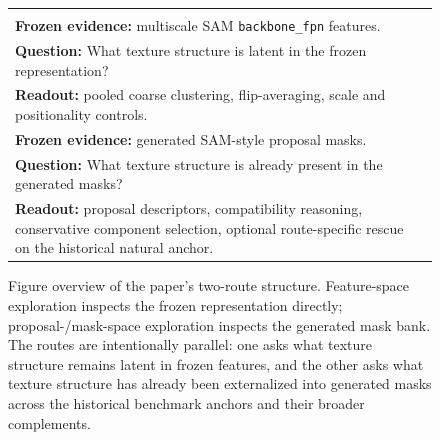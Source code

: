 \begin{figure}[t]
\centering
\setlength{\tabcolsep}{10pt}
\renewcommand{\arraystretch}{1.08}
\begin{tabularx}{\textwidth}{@{}>{\raggedright\arraybackslash}m{}>{\raggedright\arraybackslash}m{}@{}}
\fbox{%
\begin{minipage}[t][4.4cm][t]{0.44\textwidth}
\textbf{Feature-Space Exploration} \\
\textbf{Frozen evidence:} multiscale SAM \texttt{backbone\_fpn} features. \\
\textbf{Question:} What texture structure is latent in the frozen representation? \\
\textbf{Readout:} pooled coarse clustering, flip-averaging, scale and positionality controls.
\end{minipage}}
&
\fbox{%
\begin{minipage}[t][4.4cm][t]{0.44\textwidth}
\textbf{Proposal-/Mask-Space Exploration} \\
\textbf{Frozen evidence:} generated SAM-style proposal masks. \\
\textbf{Question:} What texture structure is already present in the generated masks? \\
\textbf{Readout:} proposal descriptors, compatibility reasoning, conservative component selection, optional route-specific rescue on the historical natural anchor.
\end{minipage}}
\end{tabularx}
\vspace{4pt}

\caption{Figure overview of the paper's two-route structure. Feature-space exploration inspects the frozen representation directly; proposal-/mask-space exploration inspects the generated mask bank. The routes are intentionally parallel: one asks what texture structure remains latent in frozen features, and the other asks what texture structure has already been externalized into generated masks across the historical benchmark anchors and their broader complements.}
\label{fig:recoverability_loci}
\end{figure}
